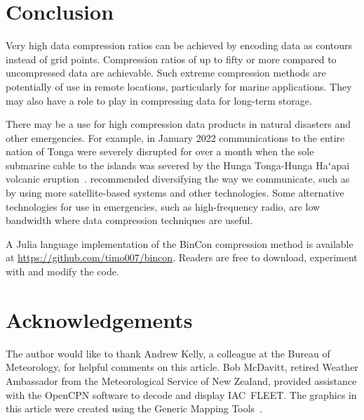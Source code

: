 \documentclass[12pt,a4paper]{article}
\newcommand{\f}{{\fontspec{LibertinusSerif}ʻ}}
\begin{document}
\section*{Conclusion}
\label{sec:conclusion}

Very high data compression ratios can be achieved by encoding data as contours
instead of grid points. Compression ratios of up to fifty or more compared to
uncompressed data are achievable. Such extreme compression methods are
potentially of use in remote locations, particularly for marine applications.
They may also have a role to play in compressing data for long-term storage.

There may be a use for high compression data products in natural disasters and
other emergencies. For example, in January 2022 communications to the
entire nation of Tonga were severely disrupted for over a month when the sole
submarine cable to the islands was severed by the Hunga Tonga-Hunga Ha\f apai
volcanic eruption~\citep{dominey-howes2022}. \citeauthor{dominey-howes2022}
recommended diversifying the way we communicate, such as by using more
satellite-based systems and other technologies. Some alternative
technologies for use in emergencies, such as high-frequency radio, are low
bandwidth where data compression techniques are useful.

A Julia language implementation of the BinCon compression method is available
at \url{https://github.com/timo007/bincon}. Readers are free to download,
experiment with and modify the code.

\section*{Acknowledgements}
\label{sec:acknowledgements}

The author would like to thank Andrew Kelly, a colleague at the Bureau of
Meteorology, for helpful comments on this article. Bob McDavitt, retired
Weather Ambassador from the Meteorological Service of New Zealand, provided
assistance with the OpenCPN software to decode and display IAC~FLEET. The
graphics in this article were created using the Generic Mapping
Tools~\citep{wessel_etal2019}.
\end{document}
